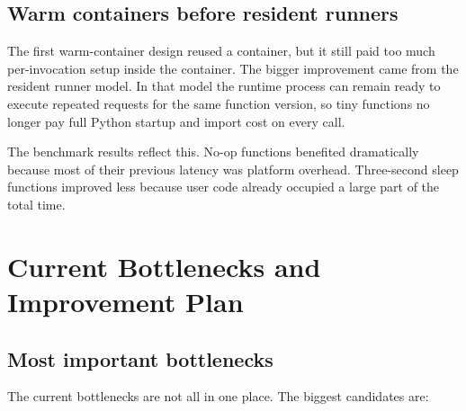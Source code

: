 \documentclass[12pt,a4paper]{report}
\begin{document}
\section{Warm containers before resident runners}

The first warm-container design reused a container, but it still paid too much
per-invocation setup inside the container. The bigger improvement came from the
resident runner model. In that model the runtime process can remain ready to
execute repeated requests for the same function version, so tiny functions no
longer pay full Python startup and import cost on every call.

The benchmark results reflect this. No-op functions benefited dramatically
because most of their previous latency was platform overhead. Three-second
sleep functions improved less because user code already occupied a large part
of the total time.

\clearpage

\chapter{Current Bottlenecks and Improvement Plan}

\section{Most important bottlenecks}

The current bottlenecks are not all in one place. The biggest candidates are:
\end{document}
